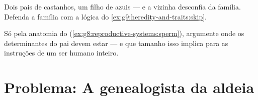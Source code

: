 \begin{exercise}[$\star\star$]\label{exo:g9:heredity-and-traits:11}
Dois pais de  castanhos, um filho de  azuis --- e
a vizinha desconfia da família. Defenda a família com a
lógica do \cref{ex:g9:heredity-and-traits:skip}.
\end{exercise}

\begin{exercise}[$\star\star\star$]\label{exo:g9:heredity-and-traits:12}
Só pela anatomia do 
(\cref{ex:g8:reproductive-systems:sperm}), argumente onde os
determinantes do pai devem estar --- e que tamanho isso
implica para as instruções de um ser humano inteiro.
\end{exercise}

\section{Problema: A genealogista da aldeia}

